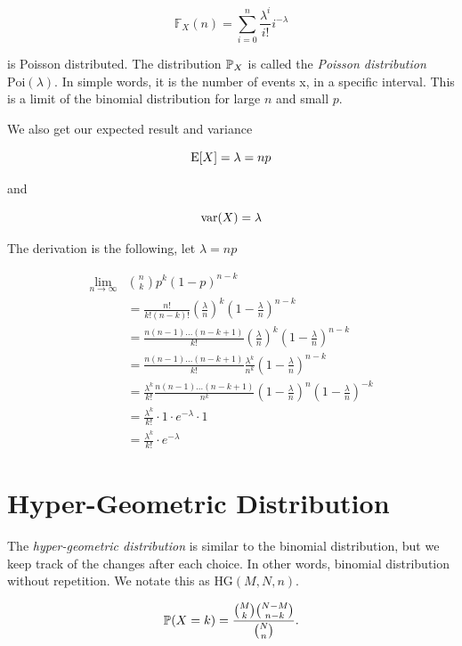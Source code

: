 \[
    \mathbb{F}_X(n) = \sum_{i = 0}^{n} \frac{\lambda^i}{i!} i^{-\lambda}
\]

is Poisson distributed. The distribution \(\mathbb{P}_X\) is called the \emph{Poisson distribution} \(\text{Poi}(\lambda)\).
In simple words, it is the number of events x, in a specific interval. This is 
a limit of the binomial distribution for large \(n\) and small \(p\).

We also get our expected result and variance 

\[
    \mathrm{E}[X] = \lambda = np
\]

and 

\[
    \mathrm{var}(X) = \lambda
\]

The derivation is the following, let \(\lambda = np\)

\begin{align*}
    \lim_{n \to \infty} &\binom{n}{k} p^k (1 - p)^{n - k} \\ 
                        &= \frac{n!}{k!(n - k)!} \left(\frac{\lambda}{n}\right)^k \left(1 - \frac{\lambda}{n}\right)^{n - k} \\ 
                        &= \frac{n(n-1)\dots(n - k + 1)}{k!} \left(\frac{\lambda}{n}\right)^k \left(1 - \frac{\lambda}{n}\right)^{n - k} \\ 
                        &= \frac{n(n-1)\dots(n - k + 1)}{k!} \frac{\lambda^k}{n^k} \left(1 - \frac{\lambda}{n}\right)^{n - k} \\ 
                        &= \frac{\lambda^k}{k!} \frac{n(n-1)\dots(n - k + 1)}{n^k} \left(1 - \frac{\lambda}{n}\right)^{n} \left(1 - \frac{\lambda}{n}\right)^{-k}  \\ 
                        &= \frac{\lambda^k}{k!} \cdot 1 \cdot e^{-\lambda} \cdot 1 \\ 
                        &= \frac{\lambda^k}{k!} \cdot e^{-\lambda} 
\end{align*}

\section{Hyper-Geometric Distribution}

The \emph{hyper-geometric distribution} is similar to the binomial distribution, but we keep track of the changes after each choice. In other words, 
binomial distribution without repetition. We notate this as \(\text{HG}(M, N, n)\).

\[
    \mathbb{P}(X = k) = \frac{\binom{M}{k} \binom{N - M}{n - k}}{\binom{N}{n}}.
\]

